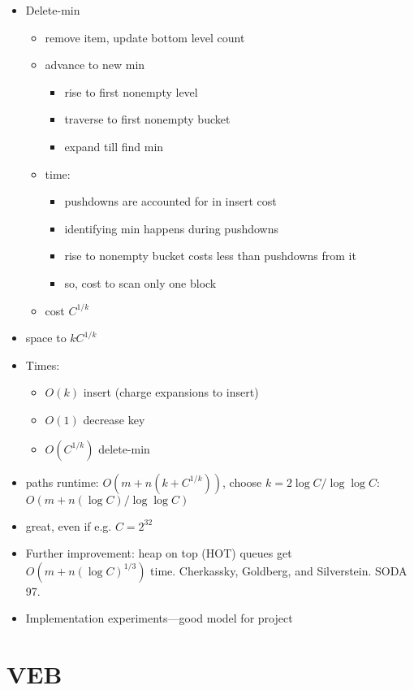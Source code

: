 \documentclass{article}
\begin{document}
\begin{itemize}
\begin{itemize}
  \end{itemize}
\item Delete-min 
  \begin{itemize}
  \item remove item, update bottom level count
  \item advance to new min
    \begin{itemize}
    \item rise to first nonempty level
    \item traverse to first nonempty bucket
    \item expand till find min
    \end{itemize}
  \item time:
    \begin{itemize}
    \item pushdowns are accounted for in insert cost
    \item identifying min happens during pushdowns
    \item rise to nonempty bucket costs less than pushdowns from it
    \item so, cost to scan only one block
    \end{itemize}
  \item cost $C^{1/k}$
  \end{itemize}
\item space to $kC^{1/k}$
\item Times:
  \begin{itemize}
  \item $O(k)$ insert (charge expansions to insert)
  \item $O(1)$ decrease key 
  \item $O(C^{1/k})$ delete-min
  \end{itemize}
\item paths runtime: $O(m+n(k+C^{1/k}))$, choose $k = 2\log C/\log
  \log C$: $O(m+n(\log C)/\log\log C)$
\item great, even if e.g. $C=2^{32}$
\item Further improvement: heap on top (HOT) queues get $O(m+n(\log
  C)^{1/3})$ time.  Cherkassky, Goldberg, and Silverstein.  SODA 97.
\item Implementation experiments---good model for project
\end{itemize}

\section{VEB}
\end{document}
